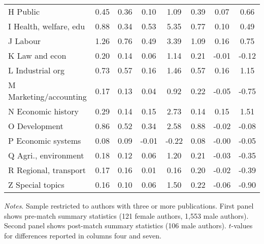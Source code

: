 \begin{table}[H]
\begin{adjustwidth}{-0.085cm}{}
\begin{threeparttable}
\begin{tabular}{p{3.55cm}S[group-separator={}]@{}S[group-separator={}]@{}S@{}S@{}S[group-separator={}]@{}S@{}S@{}}
            \quad H Public      &        0.45&        0.36&        0.10&        1.09&        0.39&        0.07&        0.66\\
            \quad I Health, welfare, edu&        0.88&        0.34&        0.53&        5.35&        0.77&        0.10&        0.49\\
            \quad J Labour      &        1.26&        0.76&        0.49&        3.39&        1.09&        0.16&        0.75\\
            \quad K Law and econ&        0.20&        0.14&        0.06&        1.14&        0.21&       -0.01&       -0.12\\
            \quad L Industrial org&        0.73&        0.57&        0.16&        1.46&        0.57&        0.16&        1.15\\
            \quad M Marketing/accounting&        0.17&        0.13&        0.04&        0.92&        0.22&       -0.05&       -0.75\\
            \quad N Economic history&        0.29&        0.14&        0.15&        2.73&        0.14&        0.15&        1.51\\
            \quad O Development &        0.86&        0.52&        0.34&        2.58&        0.88&       -0.02&       -0.08\\
            \quad P Economic systems&        0.08&        0.09&       -0.01&       -0.22&        0.08&       -0.00&       -0.05\\
            \quad Q Agri., environment&        0.18&        0.12&        0.06&        1.20&        0.21&       -0.03&       -0.35\\
            \quad R Regional, transport&        0.17&        0.16&        0.01&        0.16&        0.20&       -0.02&       -0.39\\
            \quad Z Special topics&        0.16&        0.10&        0.06&        1.50&        0.22&       -0.06&       -0.90\\
            \bottomrule
        \end{tabular}
        \begin{tablenotes}
            \tiny
            \item \textit{Notes}. Sample restricted to authors with three or more publications. First panel shows pre-match summary statistics (121 female authors, 1,553 male authors). Second panel shows post-match summary statistics (106 male authors). \(t\)-values for differences reported in columns four and seven.
        \end{tablenotes}
    \end{threeparttable}
    \end{adjustwidth}
\end{table}
